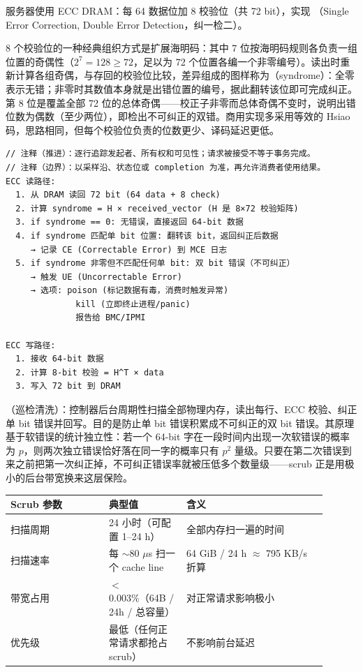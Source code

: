 

服务器使用 ECC DRAM：每 64 数据位加 8 校验位（共 72 bit），实现 （Single Error Correction, Double Error Detection，纠一检二）。

8 个校验位的一种经典组织方式是扩展海明码：其中 7 位按海明码规则各负责一组位置的奇偶性（$2^7 = 128 \ge 72$，足以为 72 个位置各编一个非零编号）。读出时重新计算各组奇偶，与存回的校验位比较，差异组成的图样称为（syndrome）：全零表示无错；非零时其数值本身就是出错位置的编号，据此翻转该位即可完成纠正。第 8 位是覆盖全部 72 位的总体奇偶——校正子非零而总体奇偶不变时，说明出错位数为偶数（至少两位），即检出不可纠正的双错。商用实现多采用等效的 Hsiao 码，思路相同，但每个校验位负责的位数更少、译码延迟更低。

\begin{lstlisting}
// 注释（推进）：逐行追踪发起者、所有权和可见性；请求被接受不等于事务完成。
// 注释（边界）：以采样沿、状态位或 completion 为准，再允许消费者使用结果。
ECC 读路径:
  1. 从 DRAM 读回 72 bit (64 data + 8 check)
  2. 计算 syndrome = H × received_vector (H 是 8×72 校验矩阵)
  3. if syndrome == 0: 无错误，直接返回 64-bit 数据
  4. if syndrome 匹配单 bit 位置: 翻转该 bit，返回纠正后数据
     → 记录 CE (Correctable Error) 到 MCE 日志
  5. if syndrome 非零但不匹配任何单 bit: 双 bit 错误（不可纠正）
     → 触发 UE (Uncorrectable Error)
     → 选项: poison (标记数据有毒，消费时触发异常)
              kill (立即终止进程/panic)
              报告给 BMC/IPMI

ECC 写路径:
  1. 接收 64-bit 数据
  2. 计算 8-bit 校验 = H^T × data
  3. 写入 72 bit 到 DRAM
\end{lstlisting}

（巡检清洗）：控制器后台周期性扫描全部物理内存，读出每行、ECC 校验、纠正单 bit 错误并回写。目的是防止单 bit 错误积累成不可纠正的双 bit 错误。其原理基于软错误的统计独立性：若一个 64-bit 字在一段时间内出现一次软错误的概率为 $p$，则两次独立错误恰好落在同一字的概率只有 $p^2$ 量级。只要在第二次错误到来之前把第一次纠正掉，不可纠正错误率就被压低多个数量级——scrub 正是用极小的后台带宽换来这层保险。

\begin{longtable}{L{0.28\linewidth}L{0.22\linewidth}L{0.4\linewidth}}
\toprule
Scrub 参数 & 典型值 & 含义 \\
\midrule
扫描周期 & 24 小时（可配置 1--24 h） & 全部内存扫一遍的时间 \\\tablerowrule
扫描速率 & 每 $\sim$80 $\mu$s 扫一个 cache line & 64 GiB / 24 h $\approx$ 795 KB/s 折算 \\\tablerowrule
带宽占用 & $<$0.003\%（64B / 24h / 总容量） & 对正常请求影响极小 \\\tablerowrule
优先级 & 最低（任何正常请求都抢占 scrub） & 不影响前台延迟 \\
\bottomrule
\end{longtable}

